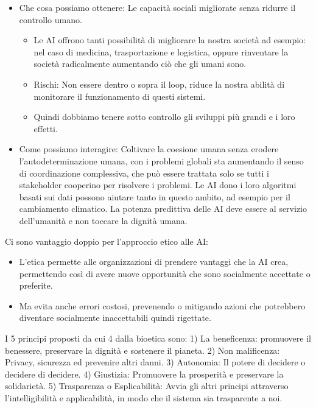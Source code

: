 \documentclass[a4page, 11pt]{article}
\begin{document}
\begin{itemize}
	\item
	Che cosa possiamo ottenere: Le capacità sociali migliorate senza
	ridurre il controllo umano.
	
	\begin{itemize}
		 
		\item
		Le AI offrono tanti possibilità di migliorare la nostra società ad
		esempio: nel caso di medicina, trasportazione e logistica, oppure
		rinventare la società radicalmente aumentando ciò che gli umani
		sono.
		\item
		Rischi: Non essere dentro o sopra il loop, riduce la nostra abilità
		di monitorare il funzionamento di questi sistemi.
		\item
		Quindi dobbiamo tenere sotto controllo gli sviluppi più grandi e i
		loro effetti.
	\end{itemize}
	\item
	Come possiamo interagire: Coltivare la coesione umana senza erodere
	l'autodeterminazione umana, con i problemi globali sta aumentando il
	senso di coordinazione complessiva, che può essere trattata solo se
	tutti i stakeholder cooperino per risolvere i problemi. Le AI dono i
	loro algoritmi basati sui dati possono aiutare tanto in questo ambito,
	ad esempio per il cambiamento climatico. La potenza predittiva delle
	AI deve essere al servizio dell'umanità e non toccare la dignità
	umana.
\end{itemize}

Ci sono vantaggio doppio per l'approccio etico alle AI:

\begin{itemize}
	 
	\item
	L'etica permette alle organizzazioni di prendere vantaggi che la AI
	crea, permettendo così di avere nuove opportunità che sono socialmente
	accettate o preferite.
	\item
	Ma evita anche errori costosi, prevenendo o mitigando azioni che
	potrebbero diventare socialmente inaccettabili quindi rigettate.
\end{itemize}

I 5 principi proposti da cui 4 dalla bioetica sono: 1) La beneficenza:
promuovere il benessere, preservare la dignità e sostenere il pianeta.
2) Non malificenza: Privacy, sicurezza ed prevenire altri danni. 3)
Autonomia: Il potere di decidere o decidere di decidere. 4) Giustizia:
Promuovere la prosperità e preservare la solidarietà. 5) Trasparenza o
Esplicabilità: Avvia gli altri principi attraverso l'intelligibilità e
applicabilità, in modo che il sistema sia trasparente a noi.
\end{document}

